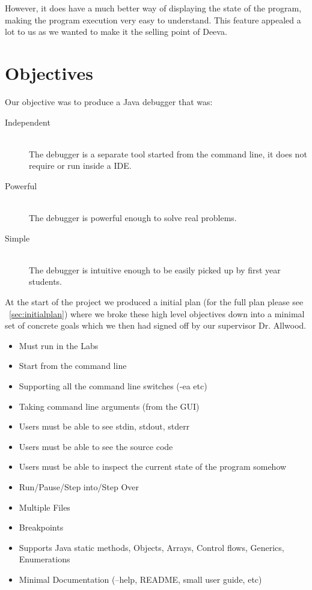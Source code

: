 \documentclass[11pt, a4paper]{article}
\begin{document}
However, it does have a much better way of displaying the state of the program, making the program execution very easy to understand. This feature appealed a lot to us as we wanted to make it the selling point of Deeva.


\section{Objectives}

Our objective was to produce a Java debugger that was:

\begin{description}
\item[Independent] \hfill \\
The debugger is a separate tool started from the command line, it does not require or run inside a IDE.
\item[Powerful] \hfill \\
The debugger is powerful enough to solve real problems.
\item[Simple] \hfill \\
The debugger is intuitive enough to be easily picked up by first year students.
\end{description}

At the start of the project we produced a initial plan (for the full plan please see ~\cref{sec:initialplan}) where we broke these high level objectives down into a minimal set of concrete goals which we then had signed off by our supervisor Dr. Allwood.

\begin{itemize}
\item Must run in the Labs
\item Start from the command line
\item Supporting all the command line switches (-ea etc)
\item Taking command line arguments (from the GUI)
\item Users must be able to see stdin, stdout, stderr
\item Users must be able to see the source code
\item Users must be able to inspect the current state of the program somehow
\item Run/Pause/Step into/Step Over
\item Multiple Files
\item Breakpoints
\item Supports Java static methods, Objects, Arrays, Control flows, Generics, Enumerations
\item Minimal Documentation (--help, README, small user guide, etc)
\end{itemize}
\end{document}
